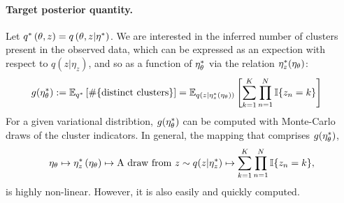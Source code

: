 

\paragraph{Target posterior quantity.}

Let $q^{*}\left(\theta, z\right) = q\left(\theta, z \vert \eta^{*}\right)$.
We are interested in the inferred number of clusters present in the observed
data, which can be expressed as an expection with respect to
$q\left(z \vert \eta_z \right)$, and so as a function of
$\eta_\theta^{*}$ via the relation $\eta_z^{*}(\eta_\theta)$:
%
\begin{align}
g(\eta_\theta^{*}) &:=
\mathbb{E}_{q^{*}} \left[ \#\{\text{distinct clusters}\} \right]  =
\mathbb{E}_{q(z \vert \eta_z^{*}(\eta_\theta))} \left[
    \sum_{k=1}^K \prod_{n=1}^N \mathbb{I}\{z_n = k\} \right]
    \label{eq:expected_num_clusters}
\end{align}
%
For a given variational distribtion, $g(\eta_\theta^{*})$ can be computed with
Monte-Carlo draws of the cluster indicators. In general, the mapping
that comprises $g(\eta_\theta^{*})$,
%
\begin{align}
\eta_\theta \mapsto
\eta_z^{*}\left(\eta_\theta\right) \mapsto
\textrm{A draw from }z \sim q(z \vert \eta_z^{*}) \mapsto
\sum_{k=1}^K \prod_{n=1}^N \mathbb{I}\{z_n = k\},
\end{align}
%
is highly non-linear.  However, it is also easily and quickly computed.
